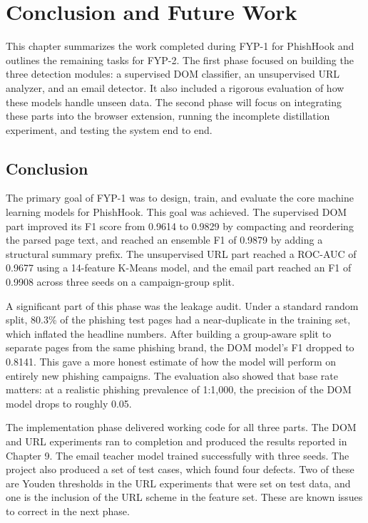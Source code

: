 \documentclass{FastFyp}
\begin{document}

\chapter{Conclusion and Future Work}
\label{ch:conclusion}

This chapter summarizes the work completed during FYP-1 for PhishHook and outlines the remaining tasks for FYP-2. The first phase focused on building the three detection modules: a supervised DOM classifier, an unsupervised URL analyzer, and an email detector. It also included a rigorous evaluation of how these models handle unseen data. The second phase will focus on integrating these parts into the browser extension, running the incomplete distillation experiment, and testing the system end to end.

\section{Conclusion}
\label{sec:ch10-conclusion}

The primary goal of FYP-1 was to design, train, and evaluate the core machine learning models for PhishHook. This goal was achieved. The supervised DOM part improved its F1 score from 0.9614 to 0.9829 by compacting and reordering the parsed page text, and reached an ensemble F1 of 0.9879 by adding a structural summary prefix. The unsupervised URL part reached a ROC-AUC of 0.9677 using a 14-feature K-Means model, and the email part reached an F1 of 0.9908 across three seeds on a campaign-group split.

A significant part of this phase was the leakage audit. Under a standard random split, 80.3\% of the phishing test pages had a near-duplicate in the training set, which inflated the headline numbers. After building a group-aware split to separate pages from the same phishing brand, the DOM model's F1 dropped to 0.8141. This gave a more honest estimate of how the model will perform on entirely new phishing campaigns. The evaluation also showed that base rate matters: at a realistic phishing prevalence of 1:1,000, the precision of the DOM model drops to roughly 0.05. 

The implementation phase delivered working code for all three parts. The DOM and URL experiments ran to completion and produced the results reported in Chapter 9. The email teacher model trained successfully with three seeds. The project also produced a set of test cases, which found four defects. Two of these are Youden thresholds in the URL experiments that were set on test data, and one is the inclusion of the URL scheme in the feature set. These are known issues to correct in the next phase.
\end{document}
